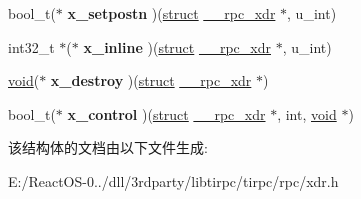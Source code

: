 \begin{DoxyCompactItemize}
bool\+\_\+t($\ast$ {\bfseries x\+\_\+setpostn} )(\hyperlink{interfacestruct}{struct} \hyperlink{struct____rpc__xdr}{\+\_\+\+\_\+rpc\+\_\+xdr} $\ast$, u\+\_\+int)
\item 
\mbox{\label{struct____rpc__xdr_1_1xdr__ops_a21704903b37e17d24b7d0c97483ff0ac}} 
int32\+\_\+t $\ast$($\ast$ {\bfseries x\+\_\+inline} )(\hyperlink{interfacestruct}{struct} \hyperlink{struct____rpc__xdr}{\+\_\+\+\_\+rpc\+\_\+xdr} $\ast$, u\+\_\+int)
\item 
\mbox{\label{struct____rpc__xdr_1_1xdr__ops_a1cd520ff1fd55f7ec8f468ab370d32e3}} 
\hyperlink{interfacevoid}{void}($\ast$ {\bfseries x\+\_\+destroy} )(\hyperlink{interfacestruct}{struct} \hyperlink{struct____rpc__xdr}{\+\_\+\+\_\+rpc\+\_\+xdr} $\ast$)
\item 
\mbox{\label{struct____rpc__xdr_1_1xdr__ops_a2391b8623cffbc1296e1af7c36bb6c3e}} 
bool\+\_\+t($\ast$ {\bfseries x\+\_\+control} )(\hyperlink{interfacestruct}{struct} \hyperlink{struct____rpc__xdr}{\+\_\+\+\_\+rpc\+\_\+xdr} $\ast$, int, \hyperlink{interfacevoid}{void} $\ast$)
\end{DoxyCompactItemize}


该结构体的文档由以下文件生成\+:\begin{DoxyCompactItemize}
\item 
E\+:/\+React\+O\+S-\/0../dll/3rdparty/libtirpc/tirpc/rpc/xdr.\+h\end{DoxyCompactItemize}
